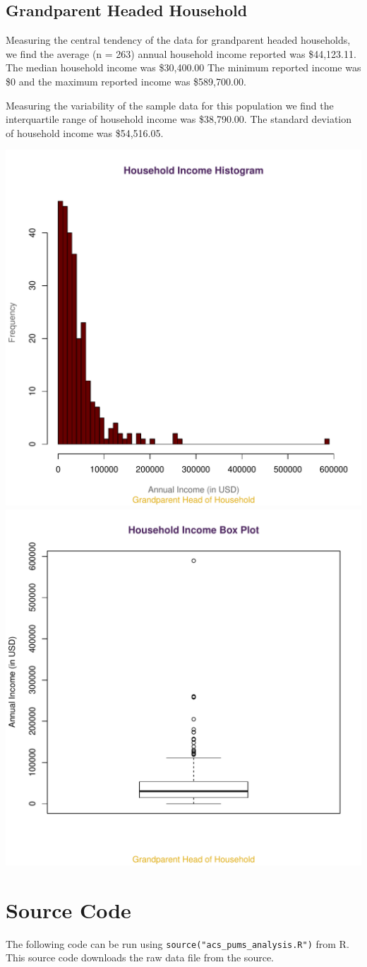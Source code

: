 \documentclass[oneside]{article}
\begin{document}
\subsection{Grandparent Headed Household}

Measuring the central tendency of the data for grandparent headed households, we find the average (n = 263) annual household income reported was \$44,123.11. The median household income was \$30,400.00 The minimum reported income was \$0 and the maximum reported income was \$589,700.00.

Measuring the variability of the sample data for this population we find the interquartile range of household income was \$38,790.00. The standard deviation of household income was \$54,516.05.

\includegraphics[width = .5\linewidth]{hist_ghh}
\includegraphics[width = .5\linewidth]{box_ghh}

\newpage
\appendix
\section{Source Code}

The following code can be run using \verb|source("acs_pums_analysis.R")| from R. This source code downloads the raw data file from the source.


\end{document}
